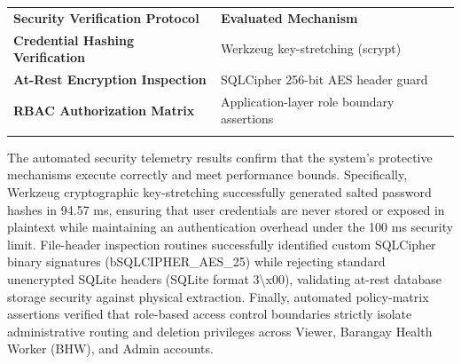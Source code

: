 \documentclass[
]{article}
\newcounter{none} %
\begin{document}
{\def\LTcaptype{none} %
\begin{longtable}[]{@{}
  >{\raggedright\arraybackslash}p{}
  >{\raggedright\arraybackslash}p{}@{}}
\toprule\noalign{}
\begin{minipage}[b]{\linewidth}\raggedright
\textbf{Security Verification Protocol}
\end{minipage} & \begin{minipage}[b]{\linewidth}\raggedright
\textbf{Evaluated Mechanism}
\end{minipage} \\
\begin{minipage}[b]{\linewidth}\raggedright
\textbf{Credential Hashing Verification}
\end{minipage} & \begin{minipage}[b]{\linewidth}\raggedright
Werkzeug key-stretching (scrypt)
\end{minipage} \\
\begin{minipage}[b]{\linewidth}\raggedright
\textbf{At-Rest Encryption Inspection}
\end{minipage} & \begin{minipage}[b]{\linewidth}\raggedright
SQLCipher 256-bit AES header guard
\end{minipage} \\
\begin{minipage}[b]{\linewidth}\raggedright
\textbf{RBAC Authorization Matrix}
\end{minipage} & \begin{minipage}[b]{\linewidth}\raggedright
Application-layer role boundary assertions
\end{minipage} \\
\midrule\noalign{}
\endhead
\bottomrule\noalign{}
\endlastfoot
\end{longtable}
}

The automated security telemetry results confirm that the system's
protective mechanisms execute correctly and meet performance bounds.
Specifically, Werkzeug cryptographic key-stretching successfully
generated salted password hashes in 94.57 ms, ensuring that user
credentials are never stored or exposed in plaintext while maintaining
an authentication overhead under the 100 ms security limit. File-header
inspection routines successfully identified custom SQLCipher binary
signatures (b\textquotesingle SQLCIPHER\_AES\_25\textquotesingle) while
rejecting standard unencrypted SQLite headers (SQLite format
3\textbackslash x00), validating at-rest database storage security
against physical extraction. Finally, automated policy-matrix assertions
verified that role-based access control boundaries strictly isolate
administrative routing and deletion privileges across Viewer, Barangay
Health Worker (BHW), and Admin accounts.
\end{document}
